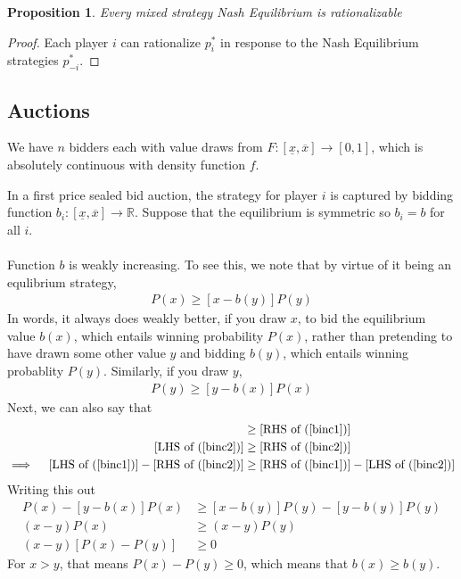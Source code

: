 \documentclass[12pt]{article}
\theoremstyle{plain}
\newtheorem{prop}[thm]{Proposition}
\theoremstyle{definition}
\theoremstyle{remark}
\newcommand{\ra}{\rightarrow}
\newcommand{\R}{\mathbb{R}}
\begin{document}
\begin{prop}
Every mixed strategy Nash Equilibrium is rationalizable
\end{prop}
\begin{proof}
Each player $i$ can rationalize $p^*_i$ in response to the Nash
Equilibrium strategies $p^*_{-i}$.
\end{proof}

\clearpage
\subsection{Auctions}

We have $n$ bidders each with value draws from
$F:[\underline{x},\overline{x}]\ra[0,1]$, which is absolutely continuous
with density function $f$.

In a first price sealed bid auction, the strategy for player $i$ is
captured by bidding function $b_i:[\underline{x},\overline{x}]\ra\R$.
Suppose that the equilibrium is symmetric so $b_i=b$ for all $i$.
\\
\\
Function $b$ is weakly increasing. To see this, we note that by virtue
of it being an equlibrium strategy,
\begin{align}
  [x-b(x)]P(x) \geq [x-b(y)]P(y)
  \label{binc1}
\end{align}
In words, it always does weakly better, if you draw $x$, to bid the
equilibrium value $b(x)$, which entails winning probability $P(x)$,
rather than pretending to have drawn some other value $y$ and bidding
$b(y)$, which entails winning probablity $P(y)$. Similarly, if you draw
$y$,
\begin{align}
  [y-b(y)]P(y) \geq [y-b(x)]P(x)
  \label{binc2}
\end{align}
Next, we can also say that
\begin{align*}
  [\text{LHS of (\ref{binc1})}]
  &\geq
  [\text{RHS of (\ref{binc1})}] \\
  [\text{LHS of (\ref{binc2})}]
  &\geq
  [\text{RHS of (\ref{binc2})}] \\
  \implies\quad
  [\text{LHS of (\ref{binc1})}]
  -
  [\text{RHS of (\ref{binc2})}]
  &\geq
  [\text{RHS of (\ref{binc1})}]
  -
  [\text{LHS of (\ref{binc2})}]
\end{align*}
Writing this out
\begin{align*}
  [x-b(x)]P(x)
  -
  [y-b(x)]P(x)
  &\geq
  [x-b(y)]P(y)
  -
  [y-b(y)]P(y) \\
  (x-y)P(x)
  &\geq
  (x-y)P(y) \\
  (x-y)[P(x)-P(y)]
  &\geq
  0
\end{align*}
For $x>y$, that means $P(x)-P(y)\geq 0$, which means that
$b(x)\geq b(y)$.
\end{document}
